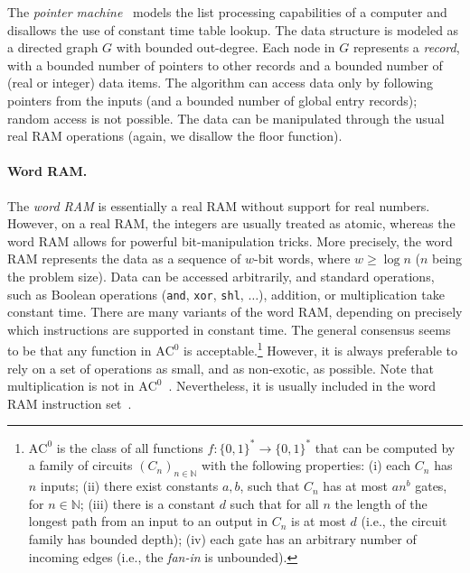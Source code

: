 \documentclass[11pt]{paper}
\begin{document}
The  \emph{pointer machine}~\cite{Knuth97} models 
the list processing capabilities
of a computer and
disallows the use of constant time table lookup.
The data structure is modeled as a directed
graph $G$ with bounded out-degree. Each node in
$G$ represents a \emph{record}, with a bounded
number of pointers to other records and a bounded number
of (real or integer) data items.  
The algorithm can access data only by following pointers
from the inputs  (and a bounded number of global entry
records); random access is not possible. The data can be 
manipulated through the usual real RAM operations (again, 
we disallow the floor function). 


\paragraph{Word RAM.}
The \emph{word RAM} is essentially a real RAM without
support for real numbers. However, on a real RAM,
the integers are usually treated as atomic, whereas
the word RAM allows for powerful bit-manipulation tricks.
More precisely, the word RAM represents the 
data as a sequence of
$w$-bit words, where $w \geq \log n$ ($n$ being the
problem size).
Data can be accessed arbitrarily, and standard
operations, such as Boolean operations 
(\texttt{and}, \texttt{xor}, \texttt{shl}, $\ldots$), addition, or
multiplication take constant time. There are many variants of
the word RAM, depending on precisely which instructions are 
supported in constant time. The general consensus seems
to be that any function in $\text{AC}^0$
is acceptable.\footnote{$\text{AC}^0$ is the 
class of all functions $f: \{0,1\}^* \rightarrow \{0,1\}^*$ that
can be computed by a family of circuits $(C_n)_{n \in \mathbb{N}}$ with the 
following properties: (i) each $C_n$ has $n$ inputs; (ii) there exist constants
$a,b$, such that $C_n$ has at most $an^b$ gates, for $n\in \mathbb{N}$; 
(iii) there is a constant $d$ such that for all $n$ the length of the longest
path from an input to an output in $C_n$ is at most $d$ (i.e., the
circuit family has bounded depth); (iv) each gate
has an arbitrary number of incoming edges (i.e., the \emph{fan-in} is 
unbounded).} However, it is always preferable to rely on a set of operations
as small, and as non-exotic, as possible.
Note that multiplication is not in $\text{AC}^0$~\cite{FurstSaSi84}. 
Nevertheless, it is usually
included in the word RAM instruction set~\cite{FredmanWi94}.
\end{document}

